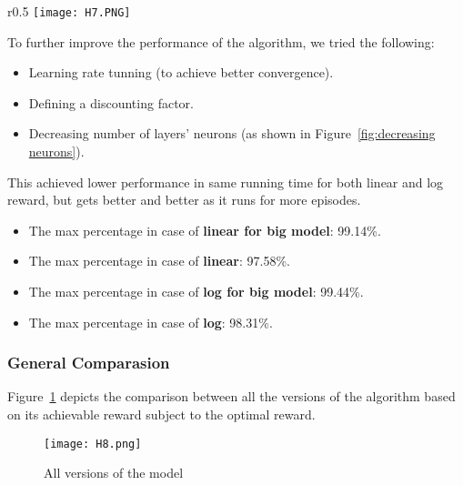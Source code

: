 \begin{wrapfigure}[10]{r}{0.5\textwidth}
    \vspace{-25pt}
    \texttt{[image: H7.PNG]}
    \caption{Effect of decreasing neurons}
    \label{fig:decreasing neurons}
\end{wrapfigure}
To further improve the performance of the algorithm, we tried the following:
\begin{itemize}
    \item Learning rate tunning (to achieve better convergence).
    \item Defining a discounting factor.
    \item Decreasing number of layers' neurons (as shown in Figure~\ref{fig:decreasing neurons}).
\end{itemize}
This achieved lower performance in same running time for both linear and log reward, but gets better and better as it runs for more episodes.
\begin{itemize}
    \item The max percentage in case of \textbf{linear for big model}: 99.14\%.
    \item The max percentage in case of \textbf{linear}: 97.58\%.
    \item The max percentage in case of \textbf{log for big model}: 99.44\%.
    \item The max percentage in case of \textbf{log}: 98.31\%.
\end{itemize}

\subsubsection{General Comparasion}
Figure~\ref{fig:all} depicts the comparison between all the versions of the algorithm based on its achievable reward subject to the optimal reward.
\begin{figure}[ht]
    \centering
    \vspace{-15pt}
    \texttt{[image: H8.png]}
    \caption{All versions of the model}
    \label{fig:all}
\end{figure}

